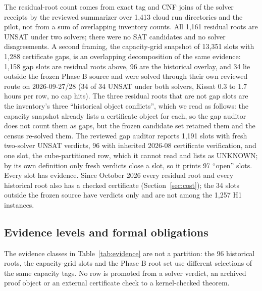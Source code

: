 \documentclass{anvil-paper}
\theoremstyle{definition}
\begin{document}
The residual-root count comes from exact tag and CNF joins of the solver receipts by the reviewed summarizer over 1,413 cloud run directories and the pilot, not from a sum of overlapping inventory counts. All 1,161 residual roots are UNSAT under two solvers; there were no SAT candidates and no solver disagreements. A second framing, the capacity-grid snapshot of 13,351 slots with 1,288 certificate gaps, is an overlapping decomposition of the same evidence: 1,158 gap slots are residual roots above, 96 are the historical overlay, and 34 lie outside the frozen Phase B source and were solved through their own reviewed route on 2026-09-27/28 (34 of 34 UNSAT under both solvers, Kissat 0.3 to 1.7 hours per row, no cap hits). The three residual roots that are not gap slots are the inventory's three ``historical object conflicts'', which we read as follows: the capacity snapshot already lists a certificate object for each, so the gap auditor does not count them as gaps, but the frozen candidate set retained them and the census re-solved them. The reviewed gap auditor reports 1,191 slots with fresh two-solver UNSAT verdicts, 96 with inherited 2026-08 certificate verification, and one slot, the cube-partitioned row, which it cannot read and lists as UNKNOWN; by its own definition only fresh verdicts close a slot, so it prints 97 ``open'' slots. Every slot has evidence. Since October 2026 every residual root and every historical root also has a checked certificate (Section~\ref{sec:cost}); the 34 slots outside the frozen source have verdicts only and are not among the 1,257 H1 instances.

\subsection{Evidence levels and formal obligations}\label{sec:evidence}

The evidence classes in Table~\ref{tab:evidence} are not a partition: the 96 historical roots, the capacity-grid slots and the Phase B root set use different selections of the same capacity tags. No row is promoted from a solver verdict, an archived proof object or an external certificate check to a kernel-checked theorem.
\end{document}
